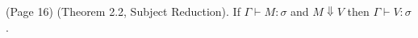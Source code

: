 (Page 16) (Theorem 2.2, Subject Reduction). If $ \Gamma \vdash M:\sigma $ and $M \Downarrow V$ then $ \Gamma \vdash V:\sigma $.